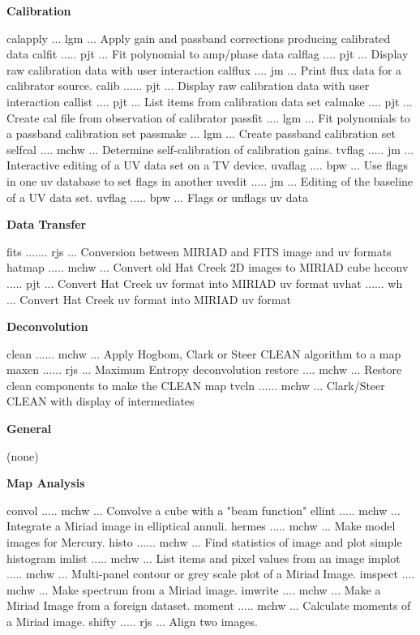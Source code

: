 \par\centerline {\bf Calibration}
{\eightpoint\begintt
calapply ... lgm  ... Apply gain and passband corrections producing calibrated data 
calfit ..... pjt  ... Fit polynomial to amp/phase data 
calflag .... pjt  ... Display raw calibration data with user interaction 
calflux .... jm   ... Print flux data for a calibrator source. 
calib ...... pjt  ... Display raw calibration data with user interaction 
\endtt}
{\eightpoint\begintt
callist .... pjt  ... List items from calibration data set 
calmake .... pjt  ... Create cal file from observation of calibrator 
passfit .... lgm  ... Fit polynomials to a passband calibration set 
passmake ... lgm  ... Create passband calibration set 
selfcal .... mchw ... Determine self-calibration of calibration gains. 
\endtt}
{\eightpoint\begintt
tvflag ..... jm   ... Interactive editing of a UV data set on a TV device. 
uvaflag .... bpw  ... Use flags in one uv database to set flags in another 
uvedit ..... jm   ... Editing of the baseline of a UV data set. 
uvflag ..... bpw  ... Flags or unflags uv data 
\endtt}
\par\centerline {\bf Data Transfer}
{\eightpoint\begintt
fits ....... rjs  ... Conversion between MIRIAD and FITS image and uv formats 
hatmap ..... mchw ... Convert old Hat Creek 2D images to MIRIAD cube 
hcconv ..... pjt  ... Convert Hat Creek uv format into MIRIAD uv format 
uvhat ...... wh   ... Convert Hat Creek uv format into MIRIAD uv format 
\endtt}
\par\centerline {\bf Deconvolution}
{\eightpoint\begintt
clean ...... mchw ... Apply Hogbom, Clark or Steer CLEAN algorithm to a map 
maxen ...... rjs  ... Maximum Entropy deconvolution 
restore .... mchw ... Restore clean components to make the CLEAN map 
tvcln ...... mchw ... Clark/Steer CLEAN with display of intermediates 
\endtt}
\par\centerline {\bf General}
{\eightpoint\begintt
(none)
\endtt}
\par\centerline {\bf Map Analysis}
{\eightpoint\begintt
convol ..... mchw ... Convolve a cube with a "beam function" 
ellint ..... mchw ... Integrate a Miriad image in elliptical annuli. 
hermes ..... mchw ... Make model images for Mercury. 
histo ...... mchw ... Find statistics of image and plot simple histogram 
imlist ..... mchw ... List items and pixel values from an image 
\endtt}
{\eightpoint\begintt
implot ..... mchw ... Multi-panel contour or grey scale plot of a Miriad Image. 
imspect .... mchw ... Make spectrum from a Miriad image.
imwrite .... mchw ... Make a Miriad Image from a foreign dataset.
moment ..... mchw ... Calculate moments of a Miriad image. 
shifty ..... rjs  ... Align two images. 
\endtt}
